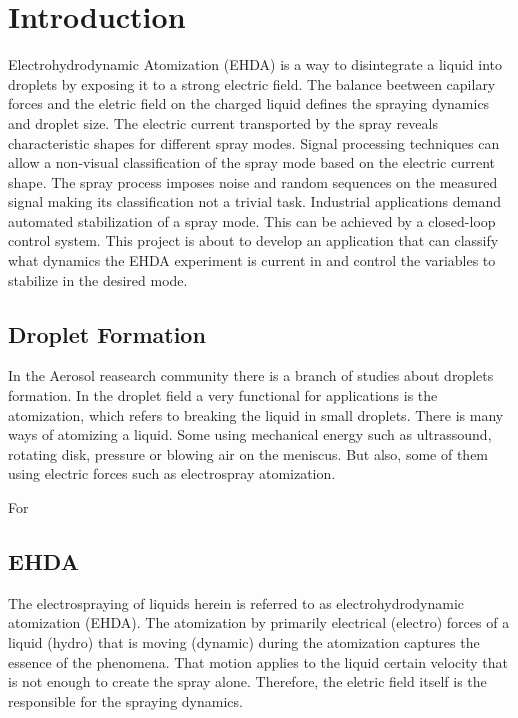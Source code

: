 \chapter{Introduction}
\label{chap:intro} %

Electrohydrodynamic Atomization (EHDA) is a way to disintegrate a liquid into droplets by exposing it to a strong electric field.\cite{prunet}
The balance beetween capilary forces and the eletric field on the charged liquid defines the spraying dynamics and droplet size.
The electric current transported by the spray reveals characteristic shapes for different spray modes.
Signal processing techniques can allow a non-visual classification of the spray mode based on the electric current shape.\cite{Sjaaks}
The spray process imposes noise and random sequences on the measured signal making its classification not a trivial task. 
Industrial applications demand automated stabilization of a spray mode. 
This can be achieved by a closed-loop control system. 
This project is about to develop an application that can classify what dynamics the EHDA experiment is current in and control the variables to stabilize in the desired mode. 

\section{Droplet Formation}
\label{sec:drop_formation}

In the Aerosol reasearch community there is a branch of studies about droplets formation. In the droplet field a very functional for applications is the atomization, which refers to breaking the liquid in small droplets.
There is many ways of atomizing a liquid. Some using mechanical energy such as ultrassound, rotating disk\cite{Disk_atomization}, pressure or blowing air on the meniscus. But also, some of them using electric forces such as electrospray atomization.

For 


\section{EHDA}
\label{sec:ehda_resume}

The electrospraying of liquids herein is referred to as electrohydrodynamic atomization (EHDA). The atomization by primarily electrical (electro) forces of a liquid (hydro) that is moving (dynamic) during the atomization captures the essence of the phenomena.\cite{Grace}
That motion applies to the liquid certain velocity that is not enough to create the spray alone. Therefore, the eletric field itself is the responsible for the spraying dynamics.\cite{prunet}

